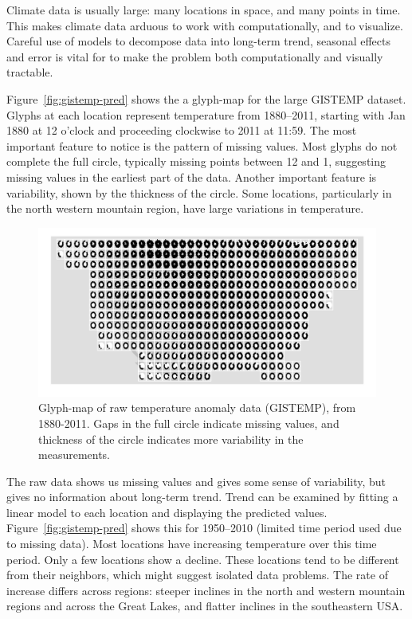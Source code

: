 \documentclass[oneside]{article}
\begin{document}
Climate data is usually large: many locations in space, and many points in time. This makes climate data arduous to work with computationally, and to visualize. Careful use of models to decompose data into long-term trend, seasonal effects and error is vital for to make the problem both computationally and visually tractable.

Figure~\ref{fig:gistemp-pred} shows the a glyph-map for the large GISTEMP dataset. Glyphs at each location represent temperature from 1880--2011, starting with Jan 1880 at 12 o'clock and proceeding clockwise to 2011 at 11:59. The most important feature to notice is the pattern of missing values. Most glyphs do not complete the full circle, typically missing points between 12 and 1, suggesting missing values in the earliest part of the data. Another important feature is variability, shown by the thickness of the circle. Some locations, particularly in the north western mountain region, have large variations in temperature. 

\begin{figure}[htbp]
  \centering

  \includegraphics[width=1\linewidth]{gistemp-polar-raw}

  \caption{Glyph-map of raw temperature anomaly data (GISTEMP), from 1880-2011. Gaps in the full circle indicate missing values, and thickness of the circle indicates more variability in the measurements.}
  \label{fig:gistemp-raw}
\end{figure}

The raw data shows us missing values and gives some sense of variability, but gives no information about long-term trend. Trend can be examined by fitting a linear model to each location and displaying the predicted values. Figure~\ref{fig:gistemp-pred} shows this for 1950--2010 (limited time period used due to missing data). Most locations have increasing temperature over this time period. Only a few locations show a decline. These locations tend to be different from their neighbors, which might suggest isolated data problems. The rate of increase differs across regions: steeper inclines in the north and western mountain regions and across the Great Lakes, and flatter inclines in the southeastern USA.
\end{document}

